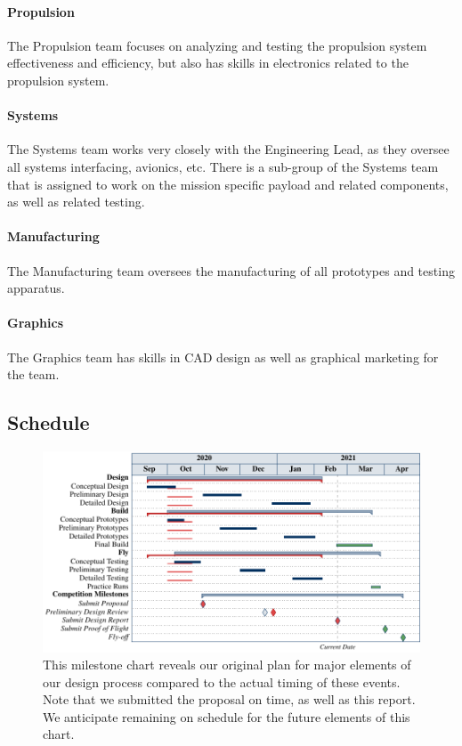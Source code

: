 \documentclass[report]{byu-aero}
\begin{document}
\paragraph{Propulsion} The Propulsion team focuses on analyzing and testing the propulsion system effectiveness and efficiency, but also has skills in electronics related to the propulsion system.
\paragraph{Systems} The Systems team works very closely with the Engineering Lead, as they oversee all systems interfacing, avionics, etc.  There is a sub-group of the Systems team that is assigned to work on the mission specific payload and related components, as well as related testing. %
\paragraph{Manufacturing} The Manufacturing team oversees the manufacturing of all prototypes and testing apparatus.
\paragraph{Graphics} The Graphics team has skills in CAD design as well as graphical marketing for the team. 


\subsection{Schedule}
\label{ssec:Schedule}


\begin{figure}[h!]
	\centering
	\includegraphics[]{milestonechart_dr.pdf}
	\caption{This milestone chart reveals our {\color{\BYUblue} original plan} for major elements of our design process compared to the  {\color{\BYUred} actual timing} of these events.  Note that we submitted the proposal on time, as well as this report.  We anticipate remaining on schedule for the {\color{\BYUgreen} future elements} of this chart.}
	\label{fig:plannedvsactualtiming}
\end{figure}
\end{document}
